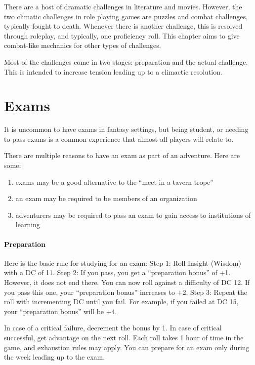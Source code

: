 \documentclass[twocolumn]{dndbook}
\begin{document}
There are a host of dramatic challenges in literature and movies.
However, the two climatic challenges in role playing games are puzzles and combat challenges, typically fought to death.
Whenever there is another challenge, this is resolved through roleplay, and typically, one proficiency roll.
This chapter aims to give combat-like mechanics for other types of challenges.\par

Most of the challenges come in two stages: preparation and the actual challenge.
This is intended to increase tension leading up to a climactic resolution.\par

\section{Exams}

It is uncommon to have exams in fantasy settings, but being student, or needing to pass exams is a common experience that almost all players will relate to.\par

There are multiple reasons to have an exam as part of an adventure. Here are some:
\begin{enumerate}
    \item exams may be a good alternative to the ``meet in a tavern trope''
    \item an exam may be required to be members of an organization
    \item adventurers may be required to pass an exam to gain access to institutions of learning
\end{enumerate}


\paragraph*{Preparation}

Here is the basic rule for studying for an exam:
Step 1: Roll Insight (Wisdom) with a DC of 11.
Step 2: If you pass, you get a ``preparation bonus'' of +1. However, it does not end there. You can now roll against a difficulty of DC 12. If you pass this one, your ``preparation bonus'' increases to +2.
Step 3: Repeat the roll with incrementing DC until you fail. For example, if you failed at DC 15, your ``preparation bonus'' will be +4.

In case of a critical failure, decrement the bonus by 1. In case of critical successful, get advantage on the next roll.
Each roll takes 1 hour of time in the game, and exhaustion rules may apply. You can prepare for an exam only during the week leading up to the exam.\par
\end{document}
